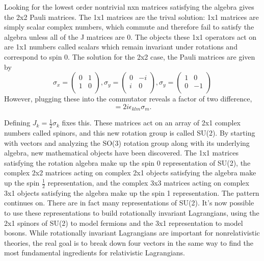 Looking for the lowest order nontrivial nxn matrices satisfying the algebra gives the 2x2 Pauli matrices. The 1x1 matrices are the trival solution: 1x1 matrices are simply scalar complex numbers, which commute and therefore fail to satisfy the algebra unless all of the J matrices are 0. The objects these 1x1 operators act on are 1x1 numbers called scalars which remain invariant under rotations and correspond to spin 0. The solution for the 2x2 case, the Pauli matrices are given by
\begin{equation}
\sigma_x = 
\begin{pmatrix}
0 & 1 \\
1 & 0 \\
\end{pmatrix},
\sigma_y = 
\begin{pmatrix}
0 & -i \\
i & 0 \\
\end{pmatrix},
\sigma_y = 
\begin{pmatrix}
1 & 0 \\
0 & -1 \\
\end{pmatrix}
\end{equation}
However, plugging these into the commutator reveals a factor of two difference,
\begin{equation}
[\sigma_k, \sigma_l] = 2i\epsilon_{klm}\sigma_m.
\end{equation}

Defining $J_k = \frac{1}{2} \sigma_k$ fixes this. These matrices act on an array of 2x1 complex numbers called spinors, and this new rotation group is called SU(2). By starting with vectors and analyzing the SO(3) rotation group along with its underlying algebra, new mathematical objects have been discovered. The 1x1 matrices satisfying the rotation algebra make up the spin 0 representation of SU(2), the complex 2x2 matrices acting on complex 2x1 objects satisfying the algebra make up the spin $\frac{1}{2}$ representation, and the complex 3x3 matrices acting on complex 3x1 objects satisfying the algebra make up the spin 1 representation. The pattern continues on. There are in fact many representations of SU(2). It's now possible to use these representations to build rotationally invariant Lagrangians, using the 2x1 spinors of SU(2) to model fermions and the 3x1 representation to model bosons. While rotationally invariant Lagrangians are important for nonrelativistic theories, the real goal is to break down four vectors in the same way to find the most fundamental ingredients for relativistic Lagrangians. 


